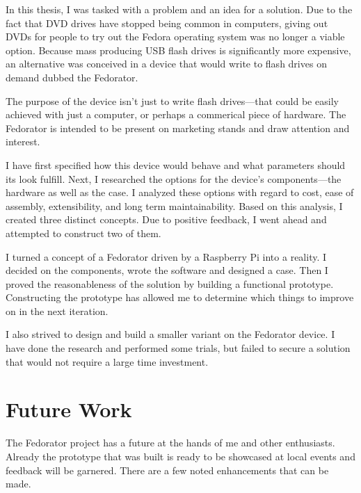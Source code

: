 \label{Conclusion}
        
        In this thesis, I was tasked with a problem and an idea for a solution.  Due to the fact that DVD drives have stopped being common in computers, giving out DVDs for people to try out the Fedora operating system was no longer a viable option.  Because mass producing USB flash drives is significantly more expensive, an alternative was conceived in a device that would write to flash drives on demand dubbed the Fedorator.
        
        The purpose of the device isn't just to write flash drives—that could be easily achieved with just a computer, or perhaps a commerical piece of hardware.  The Fedorator is intended to be present on marketing stands and draw attention and interest.
        
        I have first specified how this device would behave and what parameters should its look fulfill.  Next, I researched the options for the device's components—the hardware as well as the case.  I analyzed these options with regard to cost, ease of assembly, extensibility, and long term maintainability.  Based on this analysis, I created three distinct concepts.  Due to positive feedback, I went ahead and attempted to construct two of them.
        
        I turned a concept of a Fedorator driven by a Raspberry Pi into a reality.  I decided on the components, wrote the software and designed a case.  Then I proved the reasonableness of the solution by building a functional prototype.  Constructing the prototype has allowed me to determine which things to improve on in the next iteration.
        
        I also strived to design and build a smaller variant on the Fedorator device.  I have done the research and performed some trials, but failed to secure a solution that would not require a large time investment.%

        
        
    \section{Future Work}
        The Fedorator project has a future at the hands of me and other enthusiasts.  Already the prototype that was built is ready to be showcased at local events and feedback will be garnered.  There are a few noted enhancements that can be made.
        
        
        
